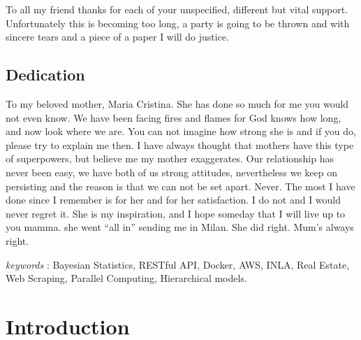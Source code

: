 \documentclass[
  12pt,
  a4paper,
  oneside]{book}
\theoremstyle{definition}
\theoremstyle{definition}
\theoremstyle{definition}
\theoremstyle{remark}
\begin{document}
To all my friend thanks for each of your unspecified, different but vital support. Unfortunately this is becoming too long, a party is going to be thrown and with sincere tears and a piece of a paper I will do justice.

\hypertarget{dedication}{%
\section*{Dedication}\label{dedication}}

To my beloved mother, Maria Cristina. She has done so much for me you would not even know. We have been facing fires and flames for God knows how long, and now look where we are. You can not imagine how strong she is and if you do, please try to explain me then. I have always thought that mothers have this type of superpowers, but believe me my mother exaggerates.
Our relationship has never been easy, we have both of us strong attitudes, nevertheless we keep on persisting and the reason is that we can not be set apart. Never.
The most I have done since I remember is for her and for her satisfaction. I do not and I would never regret it. She is my inspiration, and I hope someday that I will live up to you mamma. she went ``all in'' sending me in Milan.
She did right.
Mum's always right.

\emph{keywords} : Bayesian Statistics, RESTful API, Docker, AWS, INLA, Real Estate, Web Scraping, Parallel Computing, Hierarchical models.

\hypertarget{intro}{%
\chapter{Introduction}\label{intro}}
\end{document}

